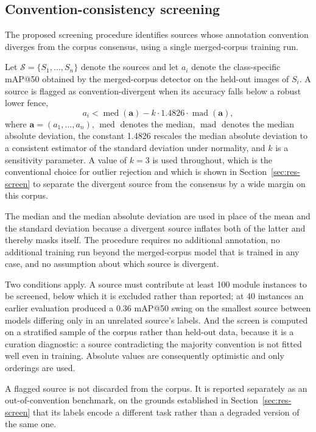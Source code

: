 \documentclass[conference]{IEEEtran}
\begin{document}
\subsection{Convention-consistency screening}
\label{sec:screen}
The proposed screening procedure identifies sources whose annotation convention
diverges from the corpus consensus, using a single merged-corpus training run.

Let $\mathcal{S}=\{S_1,\dots,S_n\}$ denote the sources and let $a_i$ denote the
class-specific mAP@50 obtained by the merged-corpus detector on the held-out
images of $S_i$. A source is flagged as convention-divergent when its accuracy
falls below a robust lower fence,
\begin{equation}
a_i < \operatorname{med}(\mathbf{a}) - k \cdot 1.4826 \cdot \operatorname{mad}(\mathbf{a}),
\label{eq:screen}
\end{equation}
where $\mathbf{a}=(a_1,\dots,a_n)$, $\operatorname{med}$ denotes the median,
$\operatorname{mad}$ denotes the median absolute deviation, the constant 1.4826
rescales the median absolute deviation to a consistent estimator of the standard
deviation under normality, and $k$ is a sensitivity parameter. A value of $k=3$
is used throughout, which is the conventional choice for outlier rejection and
which is shown in Section~\ref{sec:res-screen} to separate the divergent source
from the consensus by a wide margin on this corpus.

The median and the median absolute deviation are used in place of the mean and
the standard deviation because a divergent source inflates both of the latter and
thereby masks itself. The procedure requires no additional annotation, no
additional training run beyond the merged-corpus model that is trained in any
case, and no assumption about which source is divergent.

Two conditions apply. A source must contribute at least 100 module instances to be
screened, below which it is excluded rather than reported; at 40 instances an earlier
evaluation produced a 0.36 mAP@50 swing on the smallest source between models
differing only in an unrelated source's labels. And the screen is computed on a
stratified sample of the corpus rather than held-out data, because it is a curation
diagnostic: a source contradicting the majority convention is not fitted well even in
training. Absolute values are consequently optimistic and only orderings are used.

A flagged source is not discarded from the corpus. It is reported separately as
an out-of-convention benchmark, on the grounds established in
Section~\ref{sec:res-screen} that its labels encode a different task rather than
a degraded version of the same one.
\end{document}
